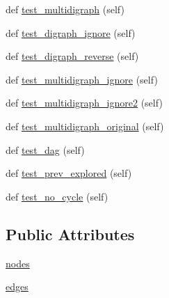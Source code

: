 \begin{DoxyCompactItemize}
\item 
def \hyperlink{classnetworkx_1_1algorithms_1_1tests_1_1test__cycles_1_1TestFindCycle_a37d8172990ea96380f8881322bf7b4b2}{test\+\_\+multidigraph} (self)
\item 
def \hyperlink{classnetworkx_1_1algorithms_1_1tests_1_1test__cycles_1_1TestFindCycle_a03aba311cdffab18fac9a87d94a0a2b1}{test\+\_\+digraph\+\_\+ignore} (self)
\item 
def \hyperlink{classnetworkx_1_1algorithms_1_1tests_1_1test__cycles_1_1TestFindCycle_ad7fff051d66ec1a0a01ed18bc4c030a9}{test\+\_\+digraph\+\_\+reverse} (self)
\item 
def \hyperlink{classnetworkx_1_1algorithms_1_1tests_1_1test__cycles_1_1TestFindCycle_af80020b903f906fcc44ca524e719ffdb}{test\+\_\+multidigraph\+\_\+ignore} (self)
\item 
def \hyperlink{classnetworkx_1_1algorithms_1_1tests_1_1test__cycles_1_1TestFindCycle_a282989bb9fb7b02bb69ef217ebbf7bf4}{test\+\_\+multidigraph\+\_\+ignore2} (self)
\item 
def \hyperlink{classnetworkx_1_1algorithms_1_1tests_1_1test__cycles_1_1TestFindCycle_ae400bebe092ef004b942f3a34cf752e2}{test\+\_\+multidigraph\+\_\+original} (self)
\item 
def \hyperlink{classnetworkx_1_1algorithms_1_1tests_1_1test__cycles_1_1TestFindCycle_a81ba4034036778acfe70a617f1906a4f}{test\+\_\+dag} (self)
\item 
def \hyperlink{classnetworkx_1_1algorithms_1_1tests_1_1test__cycles_1_1TestFindCycle_a68dbe8842d5959dc2e958902913ecec1}{test\+\_\+prev\+\_\+explored} (self)
\item 
def \hyperlink{classnetworkx_1_1algorithms_1_1tests_1_1test__cycles_1_1TestFindCycle_a42f419c8ec049f75a167e8c772ccbd3a}{test\+\_\+no\+\_\+cycle} (self)
\end{DoxyCompactItemize}
\subsection*{Public Attributes}
\begin{DoxyCompactItemize}
\item 
\hyperlink{classnetworkx_1_1algorithms_1_1tests_1_1test__cycles_1_1TestFindCycle_a10fa1d81d56f542660ad67221959714e}{nodes}
\item 
\hyperlink{classnetworkx_1_1algorithms_1_1tests_1_1test__cycles_1_1TestFindCycle_a91160c262269828eaa5fb0cebc34ab6f}{edges}
\end{DoxyCompactItemize}


